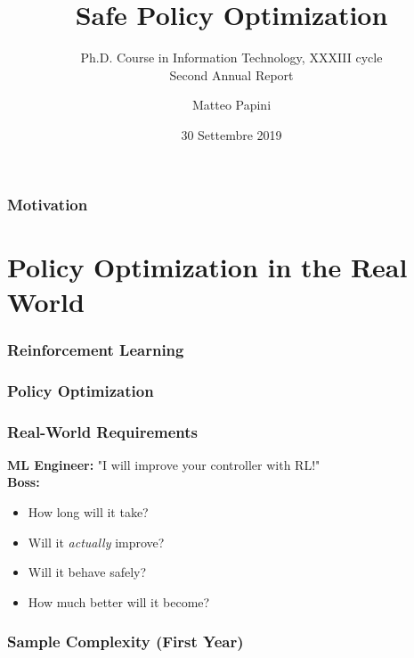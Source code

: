 \documentclass{beamer}
\title[Safe Policy Optimization]{Safe Policy Optimization}
\subtitle{{\small Ph.D. Course in Information Technology, XXXIII cycle} \\Second Annual Report}
\author[M. Papini]{Matteo Papini}
\date[30/9/2019]{\small 30 Settembre 2019}
\begin{document}
\begin{frame}
\titlepage
\end{frame}

\addtocounter{framenumber}{-1}

\begin{frame}
\frametitle{Motivation}
\end{frame}

\addtocounter{framenumber}{-1}
\begin{frame}[plain]
\tableofcontents
\end{frame}

\section{Policy Optimization in the Real World}
\addtocounter{framenumber}{-1}
\frame{\tableofcontents[currentsection]}

\begin{frame}
\frametitle{Reinforcement Learning}
\end{frame}

\begin{frame}
\frametitle{Policy Optimization}
\end{frame}

\begin{frame}
\frametitle{Real-World Requirements}
{\bf ML Engineer:} "I will improve your controller with RL!"\\
\vspace{.5cm}
{\bf Boss:}
\begin{itemize}
	\setlength{\itemsep}{10pt}
	\item How long will it take?
	\item Will it \emph{actually} improve?
	\item Will it behave safely?
	\item How much better will it become?
\end{itemize}
\end{frame}

\begin{frame}
\frametitle{Sample Complexity (First Year)}
\end{frame}
\end{document}
